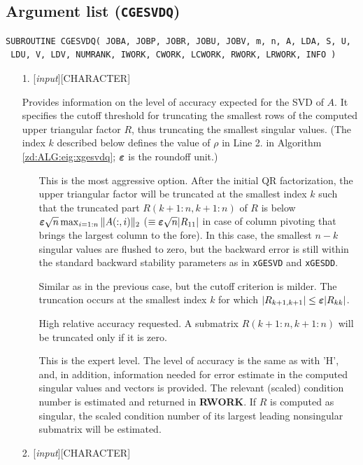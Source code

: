 \documentclass[12pt, a4paper, final]{article}
\def\roff  {\mbox{\boldmath$\varepsilon$}}
\numberwithin{equation}{section}
\begin{document}
\subsection{Argument list (\texttt{CGESVDQ})}
\begin{verbatim}
SUBROUTINE CGESVDQ( JOBA, JOBP, JOBR, JOBU, JOBV, m, n, A, LDA, S, U,
 LDU, V, LDV, NUMRANK, IWORK, CWORK, LCWORK, RWORK, LRWORK, INFO )
\end{verbatim}
\begin{itemize}
	\item[1.]  [\emph{input}][{\sc CHARACTER}] 
	
	Provides information on the level of accuracy expected for the SVD of $A$.
	It specifies the cutoff threshold for truncating the smallest rows of the computed upper triangular factor $R$, thus truncating the smallest singular values. (The index $k$ described below defines the value of $\rho$ in Line 2. in Algorithm \ref{zd:ALG:eig:xgesvdq}; $\roff$ is the roundoff unit.) 
	\begin{itemize}
		\item[\framebox{'A'}] This is the most aggressive option. After the initial QR factorization, the upper triangular factor will be truncated at the smallest index $k$ such that the truncated part $R(k+1:n,k+1:n)$ of $R$ is below $\roff \sqrt{n}\max_{i=1:n}\|A(:,i)\|_2$ ($\equiv \roff \sqrt{n} |R_{11}|$ in case of column pivoting that brings the largest column to the fore). In this case, the smallest $n-k$ singular values are flushed to zero, but the backward error is still within the standard backward stability parameters as in \texttt{xGESVD} and \texttt{xGESDD}.
		\item[\framebox{'M'}] Similar as in the previous case, but the cutoff criterion is milder. The truncation occurs at the smallest index $k$ for which $|R_{k+1,k+1}| \leq \roff |R_{kk}|$. 
		\item[\framebox{'H'}] High relative accuracy requested. A submatrix $R(k+1:n,k+1:n)$ will be truncated only if it is zero.
		\item[\framebox{'E'}] This is the expert level. The level of accuracy is the same as with 'H', and, in addition, information needed for error estimate in the computed singular values and vectors is provided. The relevant (scaled) condition number is estimated and returned in \textbf{RWORK}. If $R$ is computed as singular, the scaled condition number of its largest leading nonsingular submatrix will be estimated.
	\end{itemize}
	\item[2.]  [\emph{input}][{\sc CHARACTER}] 
	

\end{itemize}
\end{document}
